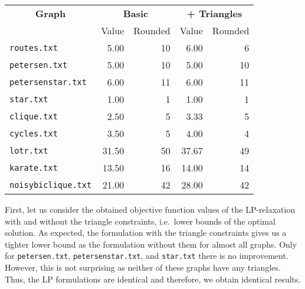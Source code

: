 \documentclass{article}
\begin{document}
\begin{center}
    \begin{tabular}{l|r r|r r}
        \multicolumn{1}{c}{\textbf{Graph}} & \multicolumn{2}{|c|}{\textbf{Basic}} & \multicolumn{2}{c}{\textbf{+ Triangles}}\\
        & Value & Rounded & Value & Rounded\\
        \hline
        \lstinline|routes.txt| & 5.00 & 10 & 6.00 & 6\\
        \lstinline|petersen.txt| & 5.00 & 10 & 5.00 & 10\\
        \lstinline|petersenstar.txt| & 6.00 & 11 & 6.00 & 11\\
        \lstinline|star.txt| & 1.00 & 1 & 1.00 & 1\\
        \lstinline|clique.txt| & 2.50 & 5 & 3.33 & 5\\
        \lstinline|cycles.txt| & 3.50 & 5 & 4.00 & 4\\
        \lstinline|lotr.txt| & 31.50 & 50 & 37.67 & 49\\
        \lstinline|karate.txt| & 13.50 & 16 & 14.00 & 14\\
        \lstinline|noisybiclique.txt| & 21.00 & 42 & 28.00 & 42\\
    \end{tabular}
\end{center}

First, let us consider the obtained objective function values of the LP-relaxation with and without the triangle constraints, i.e.~lower bounds of the optimal solution. As expected, the formulation with the triangle constraints gives us a tighter lower bound as the formulation without them for almost all graphs. Only for \lstinline|petersen.txt|, \lstinline|petersenstar.txt|, and \lstinline|star.txt| there is no improvement. However, this is not surprising as neither of these graphs have any triangles. Thus, the LP formulations are identical and therefore, we obtain identical results.





\end{document}
